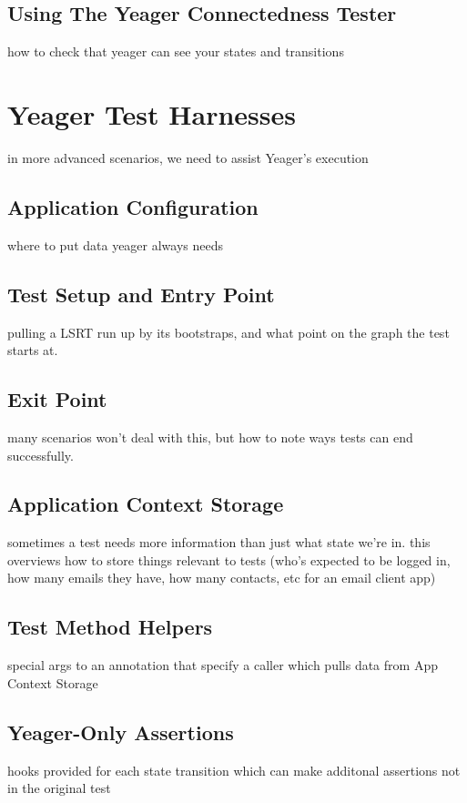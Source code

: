 \subsection{Using The Yeager Connectedness Tester}
how to check that yeager can see your states and transitions

\section{Yeager Test Harnesses}
in more advanced scenarios, we need to assist Yeager's execution

\subsection{Application Configuration}
where to put data yeager always needs

\subsection{Test Setup and Entry Point}
pulling a LSRT run up by its bootstraps, and what point on the graph the test starts at.

\subsection{Exit Point}
many scenarios won't deal with this, but how to note ways tests can end successfully.

\subsection{Application Context Storage}
sometimes a test needs more information than just what state we're in. this overviews how to store things relevant to tests (who's expected to be logged in, how many emails they have, how many contacts, etc for an email client app)

\subsection{Test Method Helpers}
special args to an annotation that specify a caller which pulls data from App Context Storage

\subsection{Yeager-Only Assertions}
hooks provided for each state transition which can make additonal assertions not in the original test


